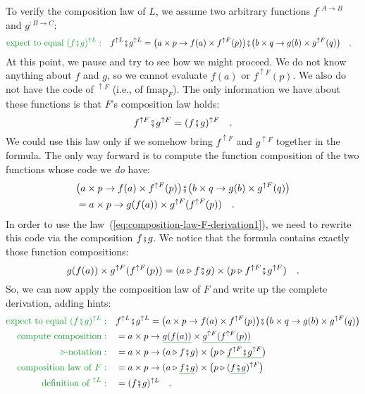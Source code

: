 To verify the composition law of $L$, we assume two arbitrary functions
$f^{:A\rightarrow B}$ and $g^{:B\rightarrow C}$:
\begin{align*}
{\color{greenunder}\text{expect to equal }(f\bef g)^{\uparrow L}:}\quad & f^{\uparrow L}\bef g^{\uparrow L}=\big(a\times p\rightarrow f(a)\times f^{\uparrow F}(p)\big)\bef\big(b\times q\rightarrow g(b)\times g^{\uparrow F}(q)\big)\quad.
\end{align*}
At this point, we pause and try to see how we might proceed. We do
not know anything about $f$ and $g$, so we cannot evaluate $f(a)$
or $f^{\uparrow F}(p)$. We also do not have the code of $^{\uparrow F}$
(i.e., of $\text{fmap}_{F}$). The only information we have about
these functions is that $F$\textsf{'}s composition law holds:
\begin{equation}
f^{\uparrow F}\bef g^{\uparrow F}=(f\bef g)^{\uparrow F}\quad.\label{eq:composition-law-F-derivation1}
\end{equation}
We could use this law only if we somehow bring $f^{\uparrow F}$ and
$g^{\uparrow F}$ together in the formula. The only way forward is
to compute the function composition of the two functions whose code
we \emph{do} have:
\begin{align*}
 & \big(a\times p\rightarrow f(a)\times f^{\uparrow F}(p)\big)\bef\big(b\times q\rightarrow g(b)\times g^{\uparrow F}(q)\big)\\
 & =a\times p\rightarrow g(f(a))\times g^{\uparrow F}(f^{\uparrow F}(p))\quad.
\end{align*}
In order to use the law~(\ref{eq:composition-law-F-derivation1}),
we need to rewrite this code via the composition $f\bef g$. We notice
that the formula contains exactly those function compositions:
\[
g(f(a))\times g^{\uparrow F}(f^{\uparrow F}(p))=(a\triangleright f\bef g)\times(p\triangleright f^{\uparrow F}\bef g^{\uparrow F})\quad.
\]
So, we can now apply the composition law of $F$ and write up the
complete derivation, adding hints:
\begin{align*}
{\color{greenunder}\text{expect to equal }(f\bef g)^{\uparrow L}:}\quad & f^{\uparrow L}\bef g^{\uparrow L}=\big(a\times p\rightarrow f(a)\times f^{\uparrow F}(p)\big)\bef\big(b\times q\rightarrow g(b)\times g^{\uparrow F}(q)\big)\\
{\color{greenunder}\text{compute composition}:}\quad & =a\times p\rightarrow\gunderline{g(f(a))}\times\gunderline{g^{\uparrow F}(f^{\uparrow F}(p))}\\
{\color{greenunder}\triangleright\text{-notation}:}\quad & =a\times p\rightarrow(a\triangleright f\bef g)\times\big(p\triangleright\gunderline{f^{\uparrow F}\bef g^{\uparrow F}}\big)\\
{\color{greenunder}\text{composition law of }F:}\quad & =a\times p\rightarrow(a\triangleright\gunderline{f\bef g})\times\big(p\triangleright(\gunderline{f\bef g})^{\uparrow F}\big)\\
{\color{greenunder}\text{definition of }^{\uparrow L}:}\quad & =(f\bef g)^{\uparrow L}\quad.
\end{align*}

